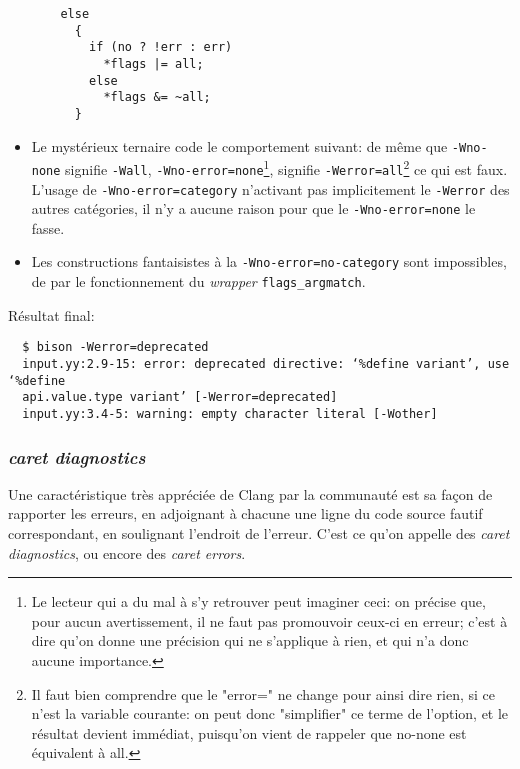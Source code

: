 \documentclass[a4paper,11pt,twoside,final]{article}
\begin{document}
\begin{itemize}
\begin{verbatim}
    else
      {
        if (no ? !err : err)
          *flags |= all;
        else
          *flags &= ~all;
      }
  \end{verbatim}


    \item Le mystérieux ternaire code le comportement suivant: de même que
      \texttt{-Wno-none} signifie \texttt{-Wall},
      \texttt{-Wno-error=none}\footnote{%
        Le lecteur qui a du mal à s'y retrouver peut imaginer ceci: on précise
        que, pour aucun avertissement, il ne faut pas promouvoir ceux-ci en
        erreur; c'est à dire qu'on donne une précision qui ne s'applique à
      rien, et qui n'a donc aucune importance.}, signifie
      \texttt{-Werror=all}\footnote{Il faut bien comprendre que le "error=" ne
        change pour ainsi dire rien, si ce n'est la variable courante: on peut
        donc "simplifier" ce terme de l'option, et le résultat devient
      immédiat, puisqu'on vient de rappeler que no-none est équivalent à all.}
      ce qui est faux. L'usage de \texttt{-Wno-error=category} n'activant pas
      implicitement le
      \texttt{-Werror} des autres catégories, il n'y a aucune raison pour que
      le \texttt{-Wno-error=none} le fasse.
    \item Les constructions fantaisistes à la \texttt{-Wno-error=no-category}
      sont impossibles, de par le fonctionnement du \textit{wrapper}
      \texttt{flags\_argmatch}.
  \end{itemize}


  Résultat final:


  \begin{verbatim}
  $ bison -Werror=deprecated
  input.yy:2.9-15: error: deprecated directive: ‘%define variant’, use ‘%define
  api.value.type variant’ [-Werror=deprecated]
  input.yy:3.4-5: warning: empty character literal [-Wother]
  \end{verbatim}

  \subsubsection{\textit{caret diagnostics}}

  Une caractéristique très appréciée de Clang par la communauté est sa façon de
  rapporter les erreurs, en adjoignant à chacune une ligne du code source
  fautif correspondant, en soulignant l'endroit de l'erreur. C'est ce qu'on
  appelle des \textit{caret diagnostics}, ou encore des \textit{caret errors}.
\end{document}
